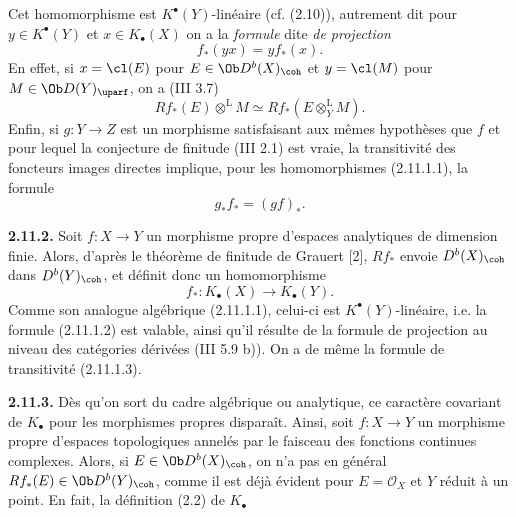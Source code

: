 Cet homomorphisme est \(K^{\bullet}(Y)\)-linéaire (cf. (2.10)), autrement dit pour \(y\in K^{\bullet}(Y)\) et \(x\in K_{\bullet}(X)\) on a la \emph{formule} dite \emph{de projection}
\begin{equation}\tag{2.11.1.2}
 f_*(yx)=y f_*(x).
\end{equation}
En effet, si \(x=\cl(E)\) pour \(E\in\Ob D^b(X)_{\coh}\) et \(y=\cl(M)\) pour \(M\in\Ob D(Y)_{\uparf}\), on a (III 3.7)
\[
 Rf_*(E)\otimes^{\mathrm L}M\simeq
 Rf_*(E\otimes_Y^{\mathrm L}M).
\]
Enfin, si \(g:Y\to Z\) est un morphisme satisfaisant aux mêmes hypothèses que \(f\) et pour lequel la conjecture de finitude (III 2.1) est vraie, la transitivité des foncteurs images directes implique, pour les homomorphismes (2.11.1.1), la formule
\begin{equation}\tag{2.11.1.3}
 g_*f_*=(gf)_*.
\end{equation}

\textbf{2.11.2.} Soit \(f:X\to Y\) un morphisme propre d'espaces analytiques de dimension finie. Alors, d'après le théorème de finitude de Grauert [2], \(Rf_*\) envoie \(D^b(X)_{\coh}\) dans \(D^b(Y)_{\coh}\), et définit donc un homomorphisme
\begin{equation}\tag{2.11.2.1}
 f_*:K_{\bullet}(X)\longrightarrow K_{\bullet}(Y).
\end{equation}
Comme son analogue algébrique (2.11.1.1), celui-ci est \(K^{\bullet}(Y)\)-linéaire, i.e. la formule (2.11.1.2) est valable, ainsi qu'il résulte de la formule de projection au niveau des catégories dérivées (III 5.9 b)). On a de même la formule de transitivité (2.11.1.3).

\textbf{2.11.3.} Dès qu'on sort du cadre algébrique ou analytique, ce caractère covariant de \(K_{\bullet}\) pour les morphismes propres disparaît. Ainsi, soit \(f:X\to Y\) un morphisme propre d'espaces topologiques annelés par le faisceau des fonctions continues complexes. Alors, si \(E\in\Ob D^b(X)_{\coh}\), on n'a pas en général \(Rf_*(E)\in\Ob D^b(Y)_{\coh}\), comme il est déjà évident pour \(E=\mathcal O_X\) et \(Y\) réduit à un point. En fait, la définition (2.2) de \(K_{\bullet}\)
